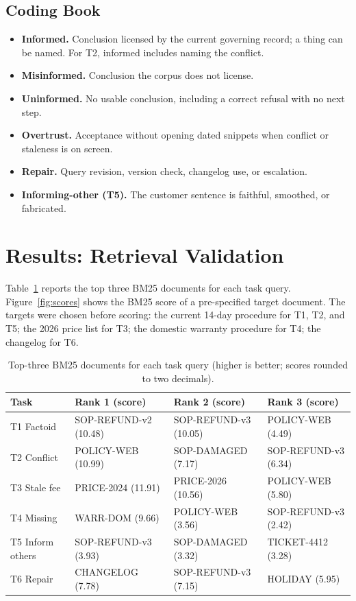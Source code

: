 \documentclass{isi2027}
\begin{document}
\subsection{Coding Book}

\begin{itemize}
  \item \textbf{Informed.} Conclusion licensed by the current governing record; a thing can be named. For T2, informed includes naming the conflict.
  \item \textbf{Misinformed.} Conclusion the corpus does not license.
  \item \textbf{Uninformed.} No usable conclusion, including a correct refusal with no next step.
  \item \textbf{Overtrust.} Acceptance without opening dated snippets when conflict or staleness is on screen.
  \item \textbf{Repair.} Query revision, version check, changelog use, or escalation.
  \item \textbf{Informing-other (T5).} The customer sentence is faithful, smoothed, or fabricated.
\end{itemize}

\section{Results: Retrieval Validation}

Table~\ref{tab:bm25} reports the top three BM25 documents for each task query. Figure~\ref{fig:scores} shows the BM25 score of a pre-specified target document. The targets were chosen before scoring: the current 14-day procedure for T1, T2, and T5; the 2026 price list for T3; the domestic warranty procedure for T4; the changelog for T6.

\begin{table}[ht]
  \caption{Top-three BM25 documents for each task query (higher is better; scores rounded to two decimals).}
  \label{tab:bm25}
  \begin{tabularx}{\textwidth}{@{}lXXX@{}}
    \toprule
    Task & Rank 1 (score) & Rank 2 (score) & Rank 3 (score) \\
    \midrule
    T1 Factoid & SOP-REFUND-v2 (10.48) & SOP-REFUND-v3 (10.05) & POLICY-WEB (4.49) \\
    T2 Conflict & POLICY-WEB (10.99) & SOP-DAMAGED (7.17) & SOP-REFUND-v3 (6.34) \\
    T3 Stale fee & PRICE-2024 (11.91) & PRICE-2026 (10.56) & POLICY-WEB (5.80) \\
    T4 Missing & WARR-DOM (9.66) & POLICY-WEB (3.56) & SOP-REFUND-v3 (2.42) \\
    T5 Inform others & SOP-REFUND-v3 (3.93) & SOP-DAMAGED (3.32) & TICKET-4412 (3.28) \\
    T6 Repair & CHANGELOG (7.78) & SOP-REFUND-v3 (7.15) & HOLIDAY (5.95) \\
    \bottomrule
  \end{tabularx}
\end{table}
\end{document}
